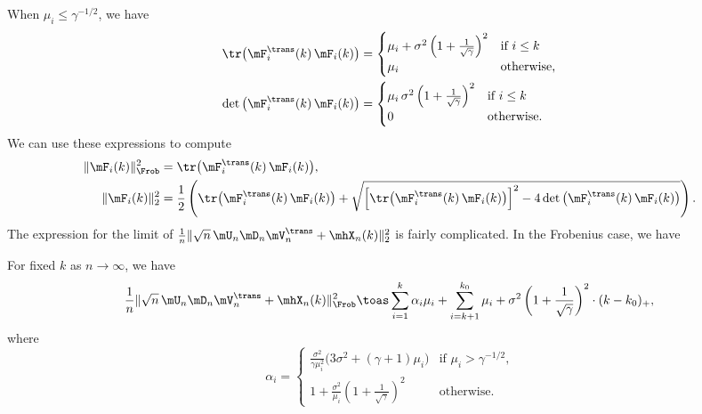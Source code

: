 When $\mu_i \leq \gamma^{-1/2}$, we have
\begin{align*}
    \tr \big( \mF_i^\trans(k) \, \mF_i(k) \big)
        &=
            \begin{cases}
                \mu_i 
                +
                \sigma^2
                \left(
                    1 + \frac{1}{\sqrt{\gamma}}
                \right)^2
                    &\text{if $i \leq k$} \\
                \mu_i
                    &\text{otherwise,}
            \end{cases} \\
    \det \big( \mF_i^\trans(k) \, \mF_i(k) \big)
        &=
            \begin{cases}
                \mu_i \,
                \sigma^2
                \left(
                    1 + \frac{1}{\sqrt{\gamma}}
                \right)^2
                    &\text{if $i \leq k$} \\
                0
                    &\text{otherwise.}
            \end{cases}
\end{align*}
We can use these expressions to compute
\begin{align*}
    \| \mF_i(k) \|_\Frob^2
        &= \tr \big( \mF_i^\trans(k) \, \mF_i(k) \big), \\
    \| \mF_i(k) \|_2^2
        &= \frac{1}{2}
           \left(
                 \tr \big( \mF_i^\trans(k) \, \mF_i(k) \big)
                 +
                 \sqrt{
                    \left[ 
                        \tr \big( \mF_i^\trans(k) \, \mF_i(k) \big) 
                    \right]^2
                    -
                    4
                    \det \big( \mF_i^\trans(k) \, \mF_i(k) \big) 
                 }
           \right).
\end{align*}
The expression for the limit of 
\(
    \frac{1}{n} 
    \| \sqrt{n} \, \mU_n \mD_n \mV_n^\trans + \mhX_n(k) \|_2^2
\)
is fairly complicated.  In the Frobenius case, we have
\begin{proposition}
    For fixed $k$ as $n \to \infty$, we have
    \[
        \frac{1}{n}
        \| \sqrt{n} \, \mU_n \mD_n \mV_n^\trans + \mhX_n(k) \|_\Frob^2
        \toas
        \sum_{i=1}^{k}
            \alpha_i \mu_i
        +
        \sum_{i=k+1}^{k_0}
            \mu_i
        +
        \sigma^2
        \left(
            1 + \frac{1}{\sqrt{\gamma}}
        \right)^2
        \cdot
        (k - k_0)_+,
    \]
    where
    \[
        \alpha_i 
        =
        \begin{cases}
            \frac{\sigma^2}{\gamma \mu_i^2}
                    \big(
                        3 \sigma^2 + (\gamma+1) \mu_i
                    \big)
                &\text{if $\mu_i > \gamma^{-1/2}$,} \\
            1 
            + 
            \frac{\sigma^2}{\mu_i}
            \left(
                1
                +
                \frac{1}{\sqrt{\gamma}}
            \right)^2
                &\text{otherwise.}
        \end{cases}
    \]
\end{proposition}

